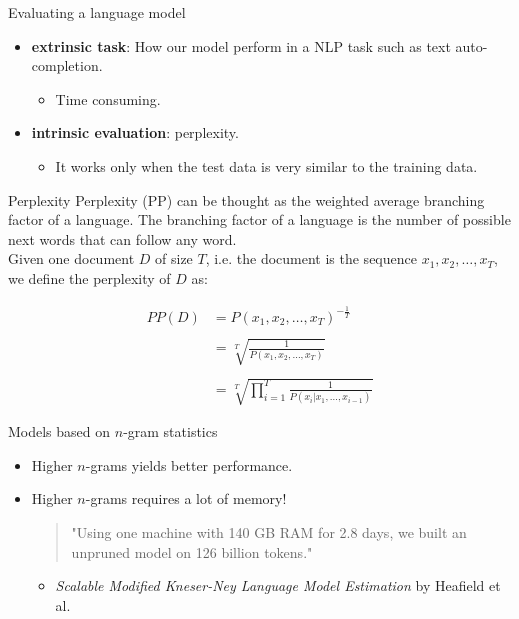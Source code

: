 \documentclass[10pt]{beamer}
\begin{document}
\begin{frame}{Evaluating a language model}

\begin{itemize}
\item \textbf{extrinsic task}: How our model perform in a NLP task such as text auto-completion.
\begin{itemize}
\item Time consuming.
\end{itemize}
\vspace{0.5cm}
\item \textbf{intrinsic evaluation}: perplexity.
\begin{itemize}
\item It works only when the test data is very similar to the training data.
\end{itemize}
\end{itemize}
\end{frame}

\begin{frame}{Perplexity}
\alert{Perplexity (PP)} can be thought as the weighted average branching factor of a language. The branching factor of a language is the number of possible next words that can follow any word.\\

Given one document $D$ of size $T$, i.e. the document is the sequence $x_1, x_2, \dots, x_T$, we define the perplexity of $D$ as:

\begin{align*}
PP(D) &= P(x_1, x_2, \dots, x_T)^{-\frac{1}{T}}\\
	  & \\
      &= \sqrt[T]{\frac{1}{P(x_1, x_2, \dots, x_T)}}\\
      & \\
      &= \sqrt[T]{\prod_{i=1}^{T}\frac{1}{P(x_i \vert x_1,\dots, x_{i-1})}}
\end{align*}
\end{frame}

\begin{frame}{Models based on $n$-gram statistics}
\begin{itemize}
\item Higher $n$-grams yields better performance.
\vspace{0.7cm}
\item Higher $n$-grams requires a lot of memory!
\vspace{0.1cm}
\begin{quote}
"Using one machine \alert{with 140 GB
RAM for 2.8 days}, we built an unpruned
model on 126 billion tokens."
\end{quote}
\begin{itemize}
\item [] \textit{Scalable Modified Kneser-Ney Language Model Estimation} by Heafield et al.
\end{itemize}
\end{itemize}
\end{frame}
\end{document}

